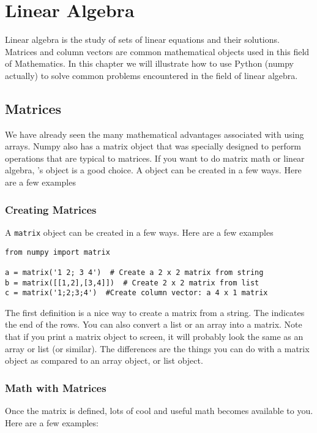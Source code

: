 \chapter{Linear Algebra}
\label{chap:linalg}
Linear algebra is the study of sets of linear equations and their
solutions.  Matrices and column vectors are common mathematical
objects used in this field of Mathematics.  In this chapter we will
illustrate how to use Python (numpy actually) to solve common problems
encountered in the field of linear algebra.
\section{Matrices}
We have already seen the many mathematical advantages associated with
using arrays.  Numpy also has a matrix object that was specially
designed to perform operations that are typical to matrices.  If you
want to do matrix math or linear algebra, 's 
object is a good choice.  A  object can be created in a
few ways.  Here are a few examples

\subsection*{Creating Matrices}
A \texttt{matrix} object can be created in a
few ways.  Here are a few examples
\begin{Verbatim}
from numpy import matrix

a = matrix('1 2; 3 4')  # Create a 2 x 2 matrix from string
b = matrix([[1,2],[3,4]])  # Create 2 x 2 matrix from list
c = matrix('1;2;3;4')  #Create column vector: a 4 x 1 matrix
\end{Verbatim}
The first definition is a nice way to create a matrix from a string.
The \code{;} indicates the end of the rows.  You can also convert a
list or an array into a matrix.  Note that if you print a matrix object
to screen, it will probably look the same as an array or list (or
similar).  The differences are the things you can do with a matrix
object as compared to an array object, or list object.

\subsection*{Math with Matrices}
Once the matrix is defined, lots of cool and useful math becomes
available to you.  Here are a few examples:

